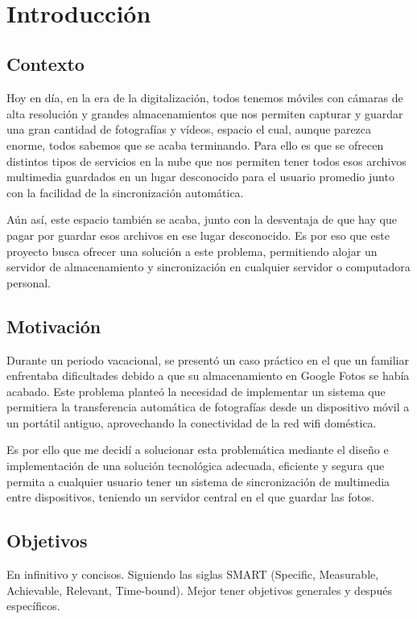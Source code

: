 \newpage
~
\newpage
\section{Introducción}

\subsection{Contexto}
Hoy en día, en la era de la digitalización, todos tenemos móviles con cámaras de alta resolución y grandes almacenamientos que nos permiten capturar y guardar una gran cantidad de fotografías y vídeos, espacio el cual, aunque parezca enorme, todos sabemos que se acaba terminando. Para ello es que se ofrecen distintos tipos de servicios en la nube que nos permiten tener todos esos archivos multimedia guardados en un lugar desconocido para el usuario promedio junto con la facilidad de la sincronización automática.

Aún así, este espacio también se acaba, junto con la desventaja de que hay que pagar por guardar esos archivos en ese lugar desconocido. Es por eso que este proyecto busca ofrecer una solución a este problema, permitiendo alojar un servidor de almacenamiento y sincronización en cualquier servidor o computadora personal.

\subsection{Motivación}
Durante un periodo vacacional, se presentó un caso práctico en el que un familiar enfrentaba dificultades debido a que su almacenamiento en Google Fotos se había acabado. Este problema planteó la necesidad de implementar un sistema que permitiera la transferencia automática de fotografías desde un dispositivo móvil a un portátil antiguo, aprovechando la conectividad de la red wifi doméstica.

Es por ello que me decidí a solucionar esta problemática mediante el diseño e implementación de una solución tecnológica adecuada, eficiente y segura que permita a cualquier usuario tener un sistema de sincronización de multimedia entre dispositivos, teniendo un servidor central en el que guardar las fotos.

\subsection{Objetivos}
En infinitivo y concisos. Siguiendo las siglas SMART (Specific, Measurable, Achievable, Relevant, Time-bound).
Mejor tener objetivos generales y después específicos.

